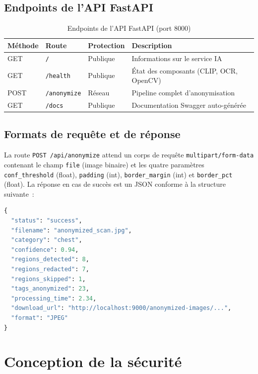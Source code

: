 \subsection{Endpoints de l'API FastAPI}

\begin{table}[H]
\centering
\caption{Endpoints de l'API FastAPI (port 8000)}
\label{tab:endpoints_fastapi}
\begin{tabularx}{\textwidth}{p{1.5cm} p{3cm} p{2cm} X}
\toprule
\textbf{Méthode} & \textbf{Route} & \textbf{Protection} & \textbf{Description} \\
\midrule
GET  & \texttt{/}         & Publique & Informations sur le service IA \\
GET  & \texttt{/health}   & Publique & État des composants (CLIP, OCR, OpenCV) \\
POST & \texttt{/anonymize}& Réseau   & Pipeline complet d'anonymisation \\
GET  & \texttt{/docs}     & Publique & Documentation Swagger auto-générée \\
\bottomrule
\end{tabularx}
\end{table}

\subsection{Formats de requête et de réponse}

La route \texttt{POST /api/anonymize} attend un corps de requête \texttt{multipart/form-data} contenant le champ \texttt{file} (image binaire) et les quatre paramètres \texttt{conf\_threshold} (float), \texttt{padding} (int), \texttt{border\_margin} (int) et \texttt{border\_pct} (float). La réponse en cas de succès est un JSON conforme à la structure suivante~:

\begin{lstlisting}[language=Python, caption={Structure de la réponse JSON d'anonymisation}]
{
  "status": "success",
  "filename": "anonymized_scan.jpg",
  "category": "chest",
  "confidence": 0.94,
  "regions_detected": 8,
  "regions_redacted": 7,
  "regions_skipped": 1,
  "tags_anonymized": 23,
  "processing_time": 2.34,
  "download_url": "http://localhost:9000/anonymized-images/...",
  "format": "JPEG"
}
\end{lstlisting}

\section{Conception de la sécurité}

